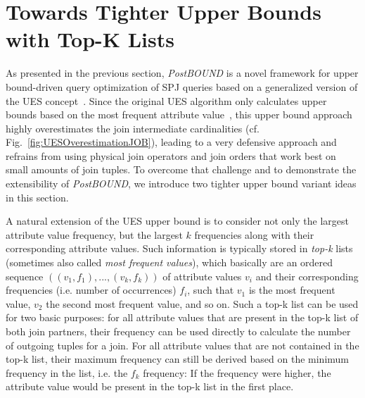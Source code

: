 \section{Towards Tighter Upper Bounds with Top-K Lists}
\label{sec:TighterBounds}


As presented in the previous section, \emph{PostBOUND} is a novel framework for upper bound-driven query optimization of SPJ queries based on a generalized version of the UES concept~\cite{hertzschuch-21-ues}. 
Since the original UES algorithm only calculates upper bounds based on the most frequent attribute value~\cite{hertzschuch-21-ues}, this upper bound approach highly overestimates the join intermediate cardinalities (cf. Fig.~\ref{fig:UESOverestimationJOB}), leading to a very defensive approach and refrains from using physical join operators and join orders that work best on small amounts of join tuples. 
To overcome that challenge and to demonstrate the extensibility of \emph{PostBOUND}, we introduce two tighter upper bound variant ideas in this section. 

A natural extension of the UES upper bound is to consider not only the largest attribute value frequency, but the largest $k$ frequencies along with their corresponding attribute values. 
Such information is typically stored in \emph{top-k} lists (sometimes also called \emph{most frequent values}), which basically are an ordered sequence $((v_1, f_1), ..., (v_k, f_k))$ of attribute values $v_i$ and their corresponding frequencies (i.e. number of occurrences) $f_i$, such that $v_1$ is the most frequent value, $v_2$ the second most frequent value, and so on.
Such a top-k list can be used for two basic purposes: for all attribute values that are present in the top-k list of both join partners, their frequency can be used directly to calculate the number of outgoing tuples for a join. 
For all attribute values that are not contained in the top-k list, their maximum frequency can still be derived based on the minimum frequency in the list, i.e. the $f_k$ frequency: If the frequency were higher, the attribute value would be present in the top-k list in the first place.

